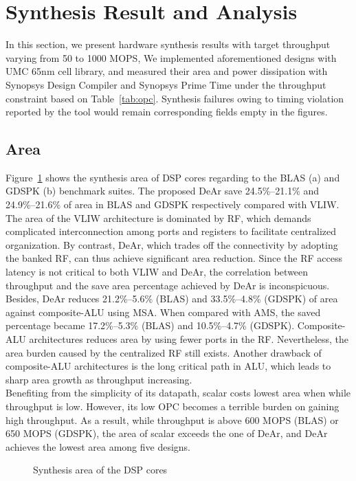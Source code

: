 \section{Synthesis Result and Analysis}
{
    In this section, we present hardware synthesis results with target throughput varying from 50 to 1000 MOPS, 
    We implemented aforementioned designs with UMC 65nm cell library, 
    and measured their area and power dissipation with Synopsys Design Compiler and Synopsys Prime Time under the throughput constraint based on Table~\ref{tab:opc}.
    Synthesis failures owing to timing violation reported by the tool would remain corresponding fields empty in the figures.
    \subsection{Area}
    Figure~\ref{chart:area} shows the synthesis area of DSP cores regarding to the BLAS (a) and GDSPK (b) benchmark suites.
    The proposed DeAr save 24.5\%--21.1\% and 24.9\%--21.6\% of area in BLAS and GDSPK respectively compared with VLIW.
    The area of the VLIW architecture is dominated by RF, 
    which demands complicated interconnection among ports and registers to facilitate centralized organization.
    By contrast, DeAr, which trades off the connectivity by adopting the banked RF, can thus achieve significant area reduction.
    Since the RF access latency is not critical to both VLIW and DeAr, 
    the correlation between throughput and the save area percentage achieved by DeAr is inconspicuous.
    \\\indent Besides, DeAr reduces 21.2\%--5.6\% (BLAS) and 33.5\%--4.8\% (GDSPK) of area against composite-ALU using MSA.
    When compared with AMS, the saved percentage became 17.2\%--5.3\% (BLAS) and 10.5\%--4.7\% (GDSPK).
    Composite-ALU architectures reduces area by using fewer ports in the RF.
    Nevertheless, the area burden caused by the centralized RF still exists.
    Another drawback of composite-ALU architectures is the long critical path in ALU, 
    which leads to sharp area growth as throughput increasing.
    \\\indent Benefiting from the simplicity of its datapath, 
    scalar costs lowest area when while throughput is low.
    However, its low OPC becomes a terrible burden on gaining high throughput.
    As a result, while throughput is above 600 MOPS (BLAS) or 650 MOPS (GDSPK), 
    the area of scalar exceeds the one of DeAr, 
    and DeAr achieves the lowest area among five designs.
    \vspace{\textfig}
    \begin{figure}[!ht]
        \begin{center}
        \end{center}
        \caption{Synthesis area of the DSP cores}
        \label{chart:area}
    \end{figure}
}
